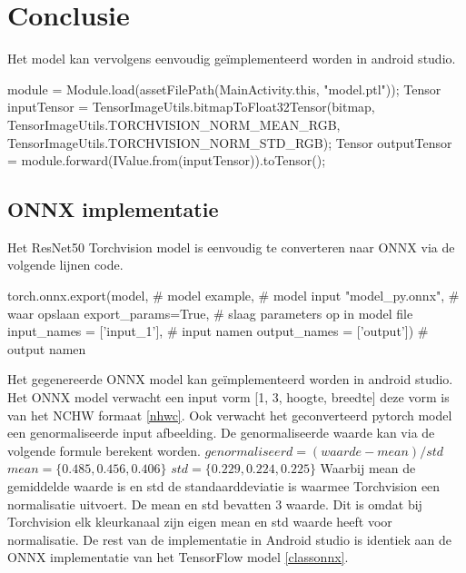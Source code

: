 \section{Conclusie}

Het model kan vervolgens eenvoudig ge\"implementeerd worden in android studio.
\begin{python}
module = Module.load(assetFilePath(MainActivity.this, "model.ptl"));
Tensor inputTensor = TensorImageUtils.bitmapToFloat32Tensor(bitmap,
            TensorImageUtils.TORCHVISION_NORM_MEAN_RGB, 
            TensorImageUtils.TORCHVISION_NORM_STD_RGB);
Tensor outputTensor = module.forward(IValue.from(inputTensor)).toTensor();
\end{python}

\subsection{ONNX implementatie}
Het ResNet50 Torchvision model is eenvoudig te converteren naar ONNX via de volgende lijnen code.
\begin{python}
torch.onnx.export(model, # model 
    example,             # model input
    "model_py.onnx",     # waar opslaan
    export_params=True,        # slaag parameters op in model file
    input_names = ['input_1'], # input namen
    output_names = ['output']) # output namen    
\end{python}

Het gegenereerde ONNX model kan ge\"implementeerd worden in android studio.
Het ONNX model verwacht een input vorm [1, 3, hoogte, breedte] deze vorm is van het NCHW formaat \ref{nhwc}.
Ook verwacht het geconverteerd pytorch model een genormaliseerde input afbeelding.
De genormaliseerde waarde kan via de volgende formule berekent worden.
\newline
\newline
$genormaliseerd = (waarde - mean) / std $
\newline
$mean = \{0.485, 0.456, 0.406\}$
\newline
$std = \{0.229, 0.224, 0.225\}$
\newline
\newline
Waarbij mean de gemiddelde waarde is en std de standaarddeviatie is waarmee Torchvision een normalisatie uitvoert.
De mean en std bevatten 3 waarde.
Dit is omdat bij Torchvision elk kleurkanaal zijn eigen mean en std waarde heeft voor normalisatie.
De rest van de implementatie in Android studio is identiek aan de ONNX implementatie van het TensorFlow model \ref{classonnx}. 


